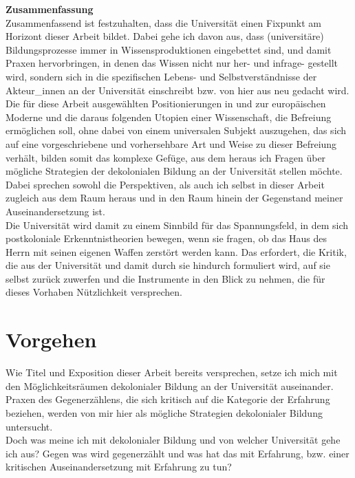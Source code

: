 \noindent\textbf{\large Zusammenfassung}\\
Zusammenfassend ist festzuhalten, dass die
Universität einen Fixpunkt am Horizont dieser Arbeit bildet. Dabei gehe ich
davon aus, dass (universitäre) Bildungsprozesse immer in Wissensproduktionen
eingebettet sind, und damit Praxen hervorbringen, in denen das Wissen nicht nur
her- und infrage- gestellt wird, sondern sich in die spezifischen Lebens- und
Selbstverständnisse der Akteur\_innen an der Universität einschreibt bzw. von
hier aus neu gedacht wird.\\
Die für diese Arbeit ausgewählten Positionierungen in und zur europäischen
Moderne und die daraus folgenden Utopien einer Wissenschaft, die Befreiung
ermöglichen soll, ohne dabei von einem universalen Subjekt auszugehen, das sich
auf eine vorgeschriebene und vorhersehbare Art und Weise zu dieser Befreiung
verhält, bilden somit das komplexe Gefüge, aus dem heraus ich Fragen über
mögliche Strategien der dekolonialen Bildung an der Universität stellen möchte.\\
Dabei sprechen sowohl die Perspektiven, als auch ich selbst in dieser Arbeit
zugleich aus dem Raum heraus und in den Raum hinein der Gegenstand meiner
Auseinandersetzung ist. \\
Die Universität wird damit zu einem Sinnbild für das
Spannungsfeld, in dem sich postkoloniale Erkenntnistheorien bewegen, wenn sie
fragen, ob das Haus des Herrn mit seinen eigenen Waffen zerstört werden
kann.\footnotemark {} Das erfordert, die Kritik, die aus der Universität und damit durch sie hindurch formuliert wird, auf sie selbst zurück zuwerfen und die Instrumente in den Blick zu nehmen, die für dieses Vorhaben Nützlichkeit versprechen.
\newpage
\section{Vorgehen}

Wie Titel und Exposition dieser Arbeit bereits versprechen, setze ich mich mit
den Möglichkeitsräumen dekolonialer Bildung an der Universität auseinander.
Praxen des Gegenerzählens, die sich kritisch auf die Kategorie der Erfahrung
beziehen, werden von mir hier als mögliche Strategien dekolonialer Bildung
untersucht.\\
Doch was meine ich mit dekolonialer Bildung und von welcher Universität gehe
ich aus? Gegen was wird gegenerzählt und was hat das mit Erfahrung, bzw. einer
kritischen Auseinandersetzung mit Erfahrung zu tun?\\


